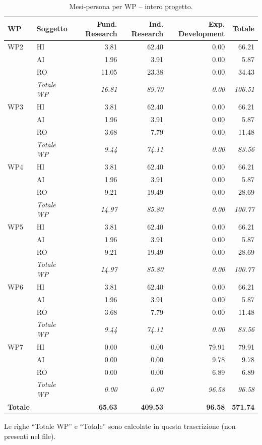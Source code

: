 \documentclass{plan4ari_report}
\begin{document}
\begin{table}[H]\centering\small\caption{Mesi-persona per WP -- intero progetto.}\label{tab:wp-w-tot}
\begin{tabular}{llrrrr}\toprule\textbf{WP} & \textbf{Soggetto} & \textbf{Fund. Research} & \textbf{Ind. Research} & \textbf{Exp. Development} & \textbf{Totale} \\\midrule
WP2 & HI & 3.81 & 62.40 & 0.00 & 66.21 \\
 & AI & 1.96 & 3.91 & 0.00 & 5.87 \\
 & RO & 11.05 & 23.38 & 0.00 & 34.43 \\
 & \textit{Totale WP} & \textit{16.81} & \textit{89.70} & \textit{0.00} & \textit{106.51} \\\midrule
WP3 & HI & 3.81 & 62.40 & 0.00 & 66.21 \\
 & AI & 1.96 & 3.91 & 0.00 & 5.87 \\
 & RO & 3.68 & 7.79 & 0.00 & 11.48 \\
 & \textit{Totale WP} & \textit{9.44} & \textit{74.11} & \textit{0.00} & \textit{83.56} \\\midrule
WP4 & HI & 3.81 & 62.40 & 0.00 & 66.21 \\
 & AI & 1.96 & 3.91 & 0.00 & 5.87 \\
 & RO & 9.21 & 19.49 & 0.00 & 28.69 \\
 & \textit{Totale WP} & \textit{14.97} & \textit{85.80} & \textit{0.00} & \textit{100.77} \\\midrule
WP5 & HI & 3.81 & 62.40 & 0.00 & 66.21 \\
 & AI & 1.96 & 3.91 & 0.00 & 5.87 \\
 & RO & 9.21 & 19.49 & 0.00 & 28.69 \\
 & \textit{Totale WP} & \textit{14.97} & \textit{85.80} & \textit{0.00} & \textit{100.77} \\\midrule
WP6 & HI & 3.81 & 62.40 & 0.00 & 66.21 \\
 & AI & 1.96 & 3.91 & 0.00 & 5.87 \\
 & RO & 3.68 & 7.79 & 0.00 & 11.48 \\
 & \textit{Totale WP} & \textit{9.44} & \textit{74.11} & \textit{0.00} & \textit{83.56} \\\midrule
WP7 & HI & 0.00 & 0.00 & 79.91 & 79.91 \\
 & AI & 0.00 & 0.00 & 9.78 & 9.78 \\
 & RO & 0.00 & 0.00 & 6.89 & 6.89 \\
 & \textit{Totale WP} & \textit{0.00} & \textit{0.00} & \textit{96.58} & \textit{96.58} \\
\midrule\textbf{Totale} & & \textbf{65.63} & \textbf{409.53} & \textbf{96.58} & \textbf{571.74} \\
\bottomrule\end{tabular}
\par\smallskip\footnotesize Le righe ``Totale WP'' e ``Totale'' sono calcolate in questa trascrizione (non presenti nel file).
\end{table}
\end{document}
